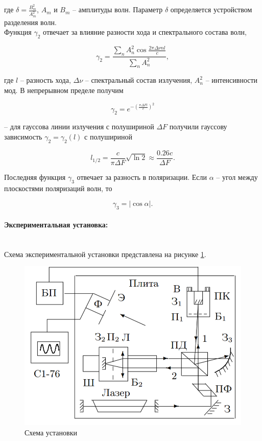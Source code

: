 \documentclass[a4paper, 12pt]{article}
\newcommand{\parag}[1]{\paragraph*{#1:}}
\begin{document}
где $\delta = \frac{B_m^2}{A_m^2}$, $A_m$ и $B_m$ -- амплитуды волн. Параметр $\delta$ определяется устройством разделения волн.\\

Функция $\gamma_2$ отвечает за влияние разности хода и спектрального состава волн,

$$
\gamma_2 = \dfrac{\sum\limits_n A^2_n \cos \frac{2\pi \Delta \nu n l}{c}}{\sum\limits_n A_n^2},
$$

где $l$ -- разность хода, $\Delta \nu$ -- спектральный состав излучения, $A_n^2$ -- интенсивности мод. В непрерывном пределе получим

$$
\gamma_2 = e^{-\left(\frac{\pi \Delta F l}{c}\right)^2}
$$

-- для гауссова линии излучения с полушириной $\Delta F$ получили гауссову зависимость $\gamma_2 = \gamma_2(l)$ с полушириной 

\begin{equation}
l_{1/2} = \dfrac{c}{\pi \Delta F}\sqrt{\ln 2} \approx \dfrac{0.26 c}{\Delta F}.
\end{equation}

Последняя функция $\gamma_3$ отвечает за разность в поляризации. Если $\alpha$ -- угол между плоскостями поляризаций волн, то

\begin{equation}
    \label{eq:gamma3}
    \gamma_3 = |\cos \alpha|.
\end{equation}

\parag {Экспериментальная установка}~\\
Схема экспериментальной установки представлена на рисунке \ref{img:setup}.

\begin{figure}[h]
    \centering
    \includegraphics[scale=0.6]{setup.png}
    \caption{Схема установки}
    \label{img:setup}
\end{figure}
\end{document}
